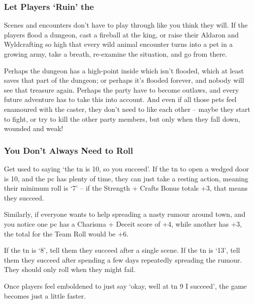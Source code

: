 \begin{multicols}{2}
\subsubsection{Let Players `Ruin' the }

Scenes and encounters don't have to play through like you think they will.
If the players flood a dungeon, cast a fireball at the king, or raise their Aldaron and Wyldcrafting so high that every wild animal encounter turns into a pet in a growing army, take a breath, re-examine the situation, and go from there.

Perhaps the dungeon has a high-point inside which isn't flooded, which at least saves that part of the dungeon; or perhaps it's flooded forever, and nobody will see that treasure again.
Perhaps the party have to become outlaws, and every future adventure has to take this into account.
And even if all those pets feel enamoured with the caster, they don't need to like each other -- maybe they start to fight, or try to kill the other party members, but only when they fall down, wounded and weak!

\subsubsection{You Don't Always Need to Roll}

Get used to saying `the \gls{tn} is 10, so you succeed'.
If the \gls{tn} to open a wedged door is 10, and the \gls{pc} has plenty of time, they can just take a resting action, meaning their minimum roll is `7' -- if the Strength + Crafts Bonus totals +3, that means they succeed.

Similarly, if everyone wants to help spreading a nasty rumour around town, and you notice one \gls{pc} has a Charisma + Deceit score of +4, while another has +3, the total for the Team Roll would be +6.

If the \gls{tn} is `8', tell them they succeed after a single scene.
If the \gls{tn} is `13', tell them they succeed after spending a few days repeatedly spreading the rumour.
They should only roll when they might fail.

Once players feel emboldened to just say `okay, well at \gls{tn} 9 I succeed', the game becomes just a little faster.

\subsection{}


\end{multicols}
